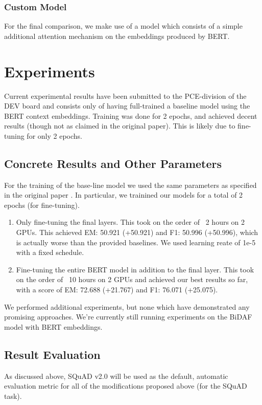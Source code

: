 \documentclass{article}
\begin{document}
\subsubsection{Custom Model}
For the final comparison, we make use of a model which consists of a simple additional attention mechanism on the embeddings produced by BERT.


\section{Experiments}
Current experimental results have been submitted to the PCE-division of the DEV board and consists only of having full-trained a baseline model using the BERT context embeddings. Training was done for 2 epochs, and achieved decent results (though not as claimed in the original paper). This is likely due to fine-tuning for only 2 epochs.

\subsection{Concrete Results and Other Parameters}
For the training of the base-line model we used the same parameters as specified in the original paper \cite{BERT}. In particular, we trainined our models for a total of 2 epochs (for fine-tuning).

\begin{enumerate}
  \item Only fine-tuning the final layers. This took on the order of ~2 hours on 2 GPUs. This achieved EM: 50.921 (+50.921) and F1: 50.996 (+50.996), which is actually worse than the provided baselines. We used learning reate of 1e-5 with a fixed schedule. 
  \item Fine-tuning the entire BERT model in addition to the final layer. This took on the order of ~10 hours on 2 GPUs and achieved our best results so far, with a score of EM: 72.688 (+21.767) and F1: 76.071 (+25.075). 
\end{enumerate}

We performed additional experiments, but none which have demonstrated any promising approaches. We're currently still running experiments on the BiDAF model with BERT embeddings.

\subsection{Result Evaluation}
As discussed above, SQuAD v2.0 will be used as the default, automatic evaluation metric for all of the modifications proposed above (for the SQuAD task). 
\end{document}
